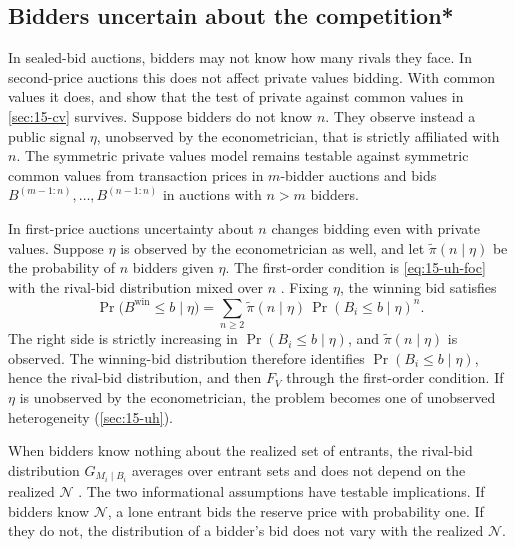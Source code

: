 \subsection{Bidders uncertain about the competition*}\label{sec:15-entry-uncertain}

In sealed-bid auctions, bidders may not know how many rivals they face. In second-price auctions this
does not affect private values bidding. With common values it does, and \citet[Theorem 12]{AtheyHaile2002}
show that the test of private against common values in \cref{sec:15-cv} survives. Suppose bidders do
not know $n$. They observe instead a public signal $\eta$, unobserved by the econometrician, that is
strictly affiliated with $n$. The symmetric private values model remains testable against symmetric common
values from transaction prices in $m$-bidder auctions and bids $B^{(m-1:n)},\dots,B^{(n-1:n)}$ in
auctions with $n>m$ bidders.

In first-price auctions uncertainty about $n$ changes bidding even with private values. Suppose $\eta$ is
observed by the econometrician as well, and let $\tilde\pi(n\mid\eta)$ be the probability of $n$
bidders given $\eta$. The first-order condition is \eqref{eq:15-uh-foc} with the rival-bid distribution
mixed over $n$ \citep[eq. (22)]{AtheyHaile2002}. Fixing $\eta$, the winning bid satisfies
\citep[eq. (23)]{AtheyHaile2002}
\[
\Pr\big(B^{\mathrm{win}}\le b\mid\eta\big)=\sum_{n\ge2}\tilde\pi(n\mid\eta)\,\Pr(B_i\le b\mid\eta)^n .
\]
The right side is strictly increasing in $\Pr(B_i\le b\mid\eta)$, and $\tilde\pi(n\mid\eta)$ is observed.
The winning-bid distribution therefore identifies $\Pr(B_i\le b\mid\eta)$, hence the rival-bid
distribution, and then $F_V$ through the first-order condition. If $\eta$ is unobserved by the
econometrician, the problem becomes one of unobserved heterogeneity (\cref{sec:15-uh}).

When bidders know nothing about the realized set of entrants, the rival-bid distribution
$G_{M_i\mid B_i}$ averages over entrant sets and does not depend on the realized $\mathcal N$
\citep[eqs. (6.21)--(6.22)]{AtheyHaile2007}. The two informational assumptions have testable
implications. If bidders know $\mathcal N$, a lone entrant bids the reserve price with probability one.
If they do not, the distribution of a bidder's bid does not vary with the realized $\mathcal N$.

